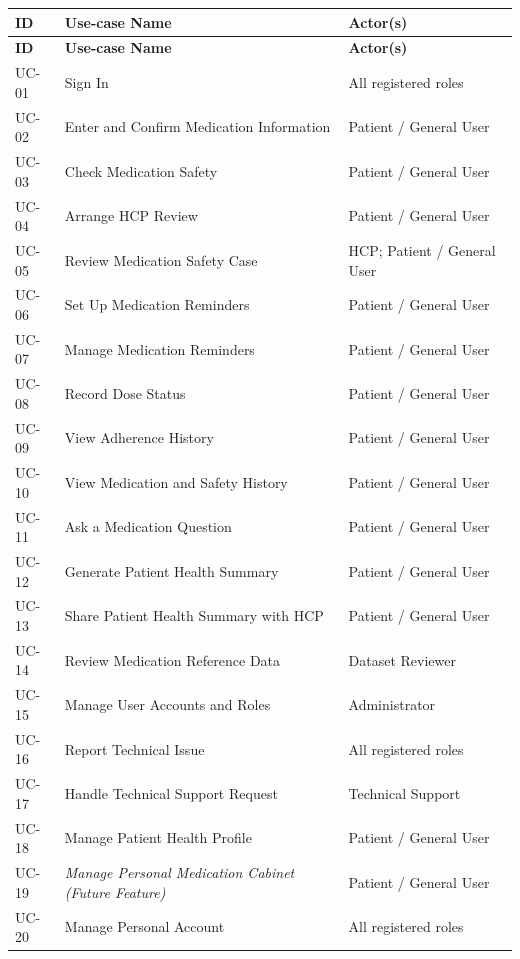 \begingroup
\small
\setlength{\tabcolsep}{4pt}
\renewcommand{\arraystretch}{1.18}
\begin{longtable}{|p{}|p{}|p{}|}
\hline
\textbf{ID} & \textbf{Use-case Name} & \textbf{Actor(s)} \\ \hline
\endfirsthead
\hline
\textbf{ID} & \textbf{Use-case Name} & \textbf{Actor(s)} \\ \hline
\endhead
UC-01 & Sign In & All registered roles \\ \hline
UC-02 & Enter and Confirm Medication Information & Patient / General User \\ \hline
UC-03 & Check Medication Safety & Patient / General User \\ \hline
UC-04 & Arrange HCP Review & Patient / General User \\ \hline
UC-05 & Review Medication Safety Case & HCP; Patient / General User \\ \hline
UC-06 & Set Up Medication Reminders & Patient / General User \\ \hline
UC-07 & Manage Medication Reminders & Patient / General User \\ \hline
UC-08 & Record Dose Status & Patient / General User \\ \hline
UC-09 & View Adherence History & Patient / General User \\ \hline
UC-10 & View Medication and Safety History & Patient / General User \\ \hline
UC-11 & Ask a Medication Question & Patient / General User \\ \hline
UC-12 & Generate Patient Health Summary & Patient / General User \\ \hline
UC-13 & Share Patient Health Summary with HCP & Patient / General User \\ \hline
UC-14 & Review Medication Reference Data & Dataset Reviewer \\ \hline
UC-15 & Manage User Accounts and Roles & Administrator \\ \hline
UC-16 & Report Technical Issue & All registered roles \\ \hline
UC-17 & Handle Technical Support Request & Technical Support \\ \hline
UC-18 & Manage Patient Health Profile & Patient / General User \\ \hline
UC-19 & \emph{Manage Personal Medication Cabinet (Future Feature)} & Patient / General User \\ \hline
UC-20 & Manage Personal Account & All registered roles \\ \hline
\end{longtable}
\endgroup

